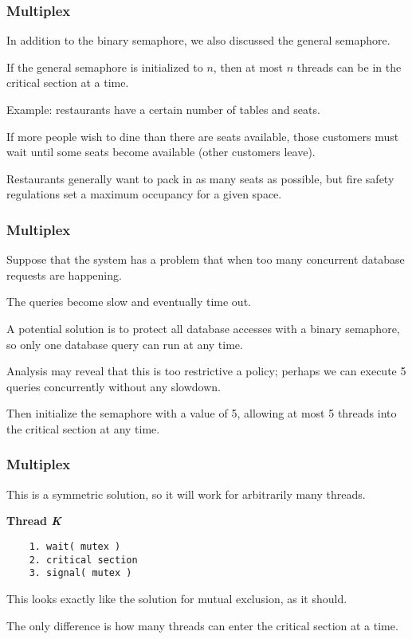 \begin{frame}
\frametitle{Multiplex}
In addition to the binary semaphore, we also discussed the general semaphore. 

If the general semaphore is initialized to $n$, then at most $n$ threads can be in the critical section at a time. 

Example: restaurants have a certain number of tables and seats. 

If more people wish to dine than there are seats available, those customers must wait until some seats become available (other customers leave). 

Restaurants generally want to pack in as many seats as possible, but fire safety regulations set a maximum occupancy for a given space.

\end{frame}

\begin{frame}
\frametitle{Multiplex}

Suppose that the system has a problem that when too many concurrent database requests are happening. 

The queries become slow and eventually time out. 

A potential solution is to protect all database accesses with a binary semaphore, so only one database query can run at any time. 

Analysis may reveal that this is too restrictive a policy; perhaps we can execute 5 queries concurrently without any slowdown. 

Then initialize the semaphore with a value of 5, allowing at most 5 threads into the critical section at any time.


\end{frame}

\begin{frame}[fragile]
\frametitle{Multiplex}


This is a symmetric solution, so it will work for arbitrarily many threads.

\textbf{Thread \textit{K}}\vspace{-6em}
  \begin{verbatim}
	1. wait( mutex )
	2. critical section
	3. signal( mutex )
  \end{verbatim}
\vspace{-2em}

This looks exactly like the solution for mutual exclusion, as it should. 

The only difference is how many threads can enter the critical section at a time.



\end{frame}

